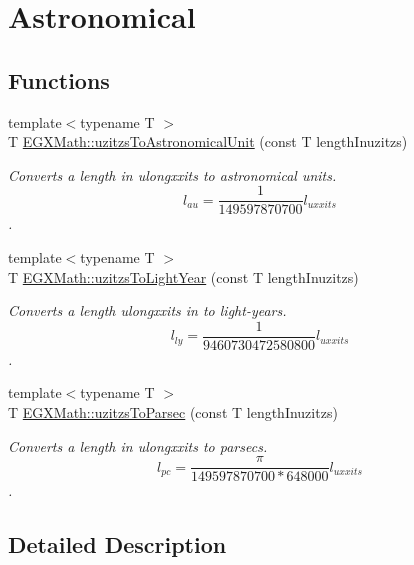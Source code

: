 \hypertarget{group___e_g_x_math-_conversions-_length_conversions-uzitzs-_astronomical}{}\section{Astronomical}
\label{group___e_g_x_math-_conversions-_length_conversions-uzitzs-_astronomical}
\subsection*{Functions}
\begin{DoxyCompactItemize}
\item 
{\footnotesize template$<$typename T $>$ }\\T \mbox{\hyperlink{group___e_g_x_math-_conversions-_length_conversions-uzitzs-_astronomical_ga5b92a4634ad3e80173c05bc3ff39f079}{E\+G\+X\+Math\+::uzitzs\+To\+Astronomical\+Unit}} (const T length\+Inuzitzs)
\begin{DoxyCompactList}\small\item\em Converts a length in ulongxxits to astronomical units. \[ l_{au}= \frac{1}{149597870700} l_{uxxits} \]. \end{DoxyCompactList}\item 
{\footnotesize template$<$typename T $>$ }\\T \mbox{\hyperlink{group___e_g_x_math-_conversions-_length_conversions-uzitzs-_astronomical_gaa6ada41d9c8a7516cb5fe8ab01976b27}{E\+G\+X\+Math\+::uzitzs\+To\+Light\+Year}} (const T length\+Inuzitzs)
\begin{DoxyCompactList}\small\item\em Converts a length ulongxxits in to light-\/years. \[ l_{ly}= \frac{1}{9460730472580800} l_{uxxits} \]. \end{DoxyCompactList}\item 
{\footnotesize template$<$typename T $>$ }\\T \mbox{\hyperlink{group___e_g_x_math-_conversions-_length_conversions-uzitzs-_astronomical_ga028a17a589e3f3d0c09daa6fbe664989}{E\+G\+X\+Math\+::uzitzs\+To\+Parsec}} (const T length\+Inuzitzs)
\begin{DoxyCompactList}\small\item\em Converts a length in ulongxxits to parsecs. \[ l_{pc}=\frac{\pi}{149597870700 * 648000} l_{uxxits} \]. \end{DoxyCompactList}\end{DoxyCompactItemize}


\subsection{Detailed Description}



